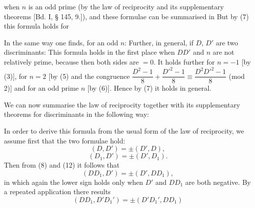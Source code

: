 
when $n$ is an odd prime (by the law of reciprocity and its supplementary theorems [Bd. I, § 145, 9.]), and these formulae can be summarised in
But by (7) this formula holds for 

In the same way one finds, for an odd $n$:
Further, in general, if $D$, $D'$ are two discriminants:
This formula holds in the first place when $DD'$ and $n$ are not relatively prime, because then both sides are $=0$. It holds further for $n=-1$ [by (3)], for $n=2$ [by (5) and the congruence $\dfrac{D^2-1}{8}+\dfrac{D'^2-1}{8} \equiv \dfrac{D^2D'^2-1}{8}$ (mod 2)] and for an odd prime $n$ [by (6)]. Hence by (7) it holds in general.

We can now summarise the law of reciprocity together with its supplementary theorems for discriminants in the following way:

In order to derive this formula from the usual form of the law of reciprocity, we assume first that the two formulae hold:
\[
(D,D') = \pm(D',D),
\]
\[
(D_1,D') = \pm(D',D_1).
\]
Then from (8) and (12) it follows that
\[
(DD_1,D') = \pm(D',DD_1),
\]
in which again the lower sign holds only when $D'$ and $DD_1$ are both negative. By a repeated application there results
\[
(DD_1,D'D_1') = \pm(D'D_1',DD_1)
\]
